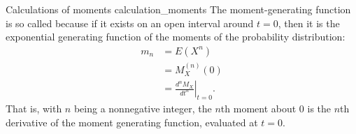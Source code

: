 \begin{lemma}{Calculations of moments \cite{wikipedia_moment_generating_function}}{calculation_moments}
	The moment-generating function is so called because if it exists on an open interval around $t = 0$, then it is the exponential generating function of the moments of the probability distribution:
	\begin{align*}
		m_{n} &= E\left(X^{n}\right) \\
		&= M_{X}^{(n)}(0) \\
		&= \left.{\frac {d^{n}M_{X}}{dt^{n}}}\right|_{t=0} .
	\end{align*}
	That is, with $n$ being a nonnegative integer, the $n$th moment about 0 is the $n$th derivative of the moment generating function, evaluated at $t = 0$.	
\end{lemma}